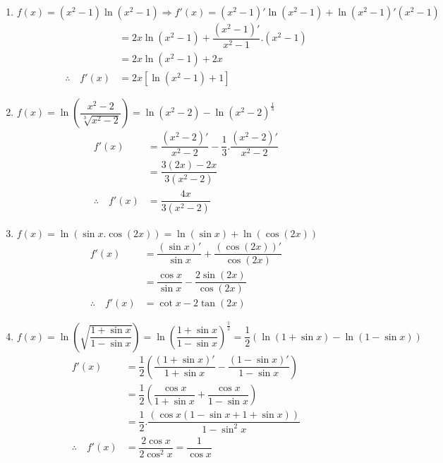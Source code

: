 \documentclass[a4paper,12pt]{article}
\begin{document}
\begin{enumerate}
	\item $f(x)=(x^2-1)\ln (x^2-1)\Longrightarrow f'(x)=(x^2-1)'\ln (x^2-1)+\ln (x^2-1)' (x^2-1)$
	      \begin{align*}
		                             & =2x\ln (x^2-1)+\dfrac{(x^2-1)'}{x^2-1}.(x^2-1) \\
		                             & =2x\ln (x^2-1)+2x                              \\
		      \therefore \quad f'(x) & =2x[ \ln (x^2-1)+1]
	      \end{align*}
	\item $f(x)=\ln \left( \dfrac{x^2-2}{\sqrt[3]{x^2-2}} \right)=\ln (x^2-2)-\ln (x^2-2)^{\frac{1}{3}}$
	      \begin{align*}
		      f'(x)                  & =\dfrac{(x^2-2)'}{x^2-2}-\dfrac{1}{3}.\dfrac{(x^2-2)'}{x^2-2} \\
		                             & =\dfrac{3(2x)-2x}{3(x^2-2)}                                   \\
		      \therefore \quad f'(x) & =\dfrac{4x}{3(x^2-2)}
	      \end{align*}
	\item $f(x)=\ln (\sin x.\cos(2x))=\ln (\sin x)+\ln (\cos (2x))$
	      \begin{align*}
		      f'(x)                  & =\dfrac{(\sin x)'}{\sin x}+\dfrac{(\cos (2x))'}{\cos (2x)} \\
		                             & =\dfrac{\cos x}{\sin x}-\dfrac{2\sin (2x)}{\cos (2x)}      \\
		      \therefore \quad f'(x) & = \cot x -2\tan (2x)
	      \end{align*}
	\item $f(x)=\ln \left(\sqrt{\dfrac{1+\sin x}{1-\sin x}} \right)=\ln \left( \dfrac{1+\sin x}{1-\sin x} \right)^{\frac{1}{2}}=\dfrac{1}{2}\left(\ln (1+\sin x)-\ln (1-\sin x)\right)$
	      \begin{align*}
		      f'(x)                  & =\dfrac{1}{2}\left(\dfrac{(1+\sin x)'}{1+\sin x}-\dfrac{(1-\sin x)'}{1-\sin x} \right) \\
		                             & =\dfrac{1}{2}\left(\dfrac{\cos x}{1+\sin x}+\dfrac{\cos x}{1-\sin x} \right)           \\
		                             & =\dfrac{1}{2}.\dfrac{\left(\cos x(1-\sin x +1+\sin x) \right)}{1-\sin^2 x}             \\
		      \therefore \quad f'(x) & =\dfrac{2\cos x}{2\cos^2 x}=\dfrac{1}{\cos x}
	      \end{align*}
\end{enumerate}
\end{document}

